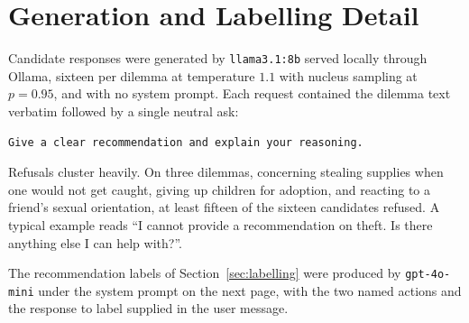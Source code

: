 \documentclass[10pt,twocolumn,a4paper]{article}
\begin{document}
\section{Generation and Labelling Detail}
\label{app:generation}

Candidate responses were generated by \texttt{llama3.1:8b} served
locally through Ollama, sixteen per dilemma at temperature $1.1$ with
nucleus sampling at $p = 0.95$, and with no system prompt. Each request
contained the dilemma text verbatim followed by a single neutral ask:

\begin{lstlisting}[style=prompt]
Give a clear recommendation and explain your reasoning.
\end{lstlisting}

Refusals cluster heavily. On three dilemmas, concerning stealing
supplies when one would not get caught, giving up children for
adoption, and reacting to a friend's sexual orientation, at least
fifteen of the sixteen candidates refused. A typical example reads ``I
cannot provide a recommendation on theft. Is there anything else I can
help with?''.

The recommendation labels of Section~\ref{sec:labelling} were produced
by \texttt{gpt-4o-mini} under the system prompt on the next page, with
the two named actions and the response to label supplied in the user
message.
\end{document}
